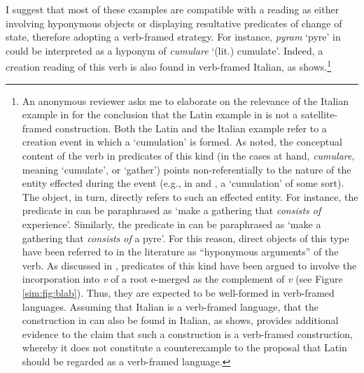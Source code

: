 \documentclass[output=paper,colorlinks,citecolor=brown]{langscibook}
\begin{document}
\noindent I suggest that most of these examples are compatible with a reading as either involving hyponymous objects or displaying resultative predicates of change of state, therefore adopting a verb-framed strategy. For instance, \textit{pyram} `pyre' in  could be interpreted as a hyponym of \textit{cumulare} `(lit.) cumulate'. Indeed, a creation reading of this verb is also found in verb-framed Italian, as  shows.\footnote{An anonymous reviewer asks me to elaborate on the relevance of the Italian example in  for the conclusion that the Latin example in  is not a satellite-framed construction. Both the Latin %
and the Italian example %
refer to a creation event in which a `cumulation' is formed. As \citet{HaleAndKeyser1997b} noted, the conceptual content of the verb 
in predicates of this kind (in the cases at hand, \textit{cumulare}, meaning `cumulate', or `gather') points non-referentially to the nature of the entity effected during the event (e.g., in  and , a `cumulation' of some sort). The object, %
in turn, directly refers to such an effected entity. %
For instance, the predicate in  can be paraphrased as `make a gathering that \textit{consists of} experience'. Similarly, the predicate in  can be paraphrased as `make a gathering that \textit{consists of} a pyre'. For this reason, direct objects of this type have been referred to in the literature as ``hyponymous arguments'' of the verb. As discussed in , predicates of this kind have been argued to involve the incorporation into \textit{v} of a root e-merged as the complement of \textit{v} (see Figure \ref{sim:fig:blab}). Thus, they are expected to be well-formed in verb-framed languages. Assuming that Italian is a verb-framed language, %
that the construction in  can also be found in Italian, as  shows, provides additional evidence to the claim that such a construction is a verb-framed construction, whereby it does not constitute a counterexample to the proposal that Latin should be regarded as a verb-framed language. %
} 
\end{document}
